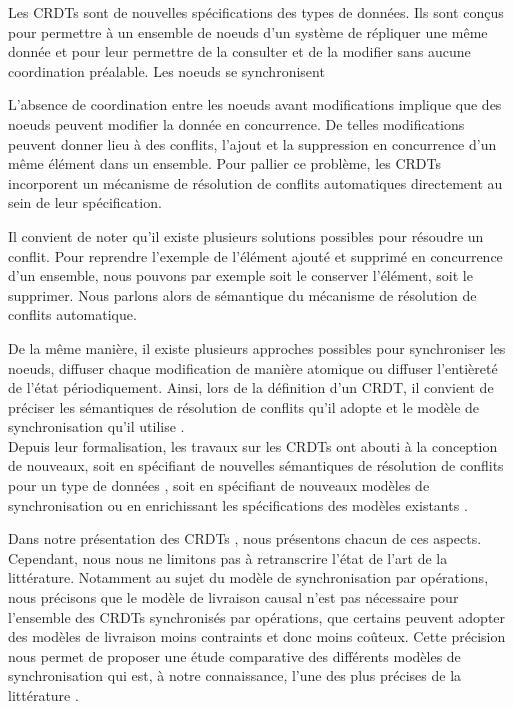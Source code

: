 Les \acfp{CRDT} \cite{shapiro_2011_crdt} sont de nouvelles spécifications des types de données.
Ils sont conçus pour permettre à un ensemble de noeuds d'un système de répliquer une même donnée et pour leur permettre de la consulter et de la modifier sans aucune coordination préalable.
Les noeuds se synchronisent

L'absence de coordination entre les noeuds avant modifications implique que des noeuds peuvent modifier la donnée en concurrence.
De telles modifications peuvent donner lieu à des conflits, \eg l'ajout et la suppression en concurrence d'un même élément dans un ensemble.
Pour pallier ce problème, les \acp{CRDT} incorporent un mécanisme de résolution de conflits automatiques directement au sein de leur spécification.

Il convient de noter qu'il existe plusieurs solutions possibles pour résoudre un conflit.
Pour reprendre l'exemple de l'élément ajouté et supprimé en concurrence d'un ensemble, nous pouvons par exemple soit le conserver l'élément, soit le supprimer.
Nous parlons alors de sémantique du mécanisme de résolution de conflits automatique.

De la même manière, il existe plusieurs approches possibles pour synchroniser les noeuds, \eg diffuser chaque modification de manière atomique ou diffuser l'entièreté de l'état périodiquement.
Ainsi, lors de la définition d'un \ac{CRDT}, il convient de préciser les sémantiques de résolution de conflits qu'il adopte et le modèle de synchronisation qu'il utilise \cite{2018-crdts-overview-preguica}.\\

Depuis leur formalisation, les travaux sur les \acp{CRDT} ont abouti à la conception de nouveaux, soit en spécifiant de nouvelles sémantiques de résolution de conflits pour un type de données \cite{2020-cl-set-weihai}, soit en spécifiant de nouveaux modèles de synchronisation \cite{Almeida_2018} ou en enrichissant les spécifications des modèles existants \cite{baquero2017pure,enes2019}.

Dans notre présentation des \acp{CRDT} , nous présentons chacun de ces aspects.
Cependant, nous nous ne limitons pas à retranscrire l'état de l'art de la littérature.
Notamment au sujet du modèle de synchronisation par opérations, nous précisons que le modèle de livraison causal n'est pas nécessaire pour l'ensemble des \acp{CRDT} synchronisés par opérations, \ie que certains peuvent adopter des modèles de livraison moins contraints et donc moins coûteux.
Cette précision nous permet de proposer une étude comparative des différents modèles de synchronisation qui est, à notre connaissance, l'une des plus précises de la littérature .\\

